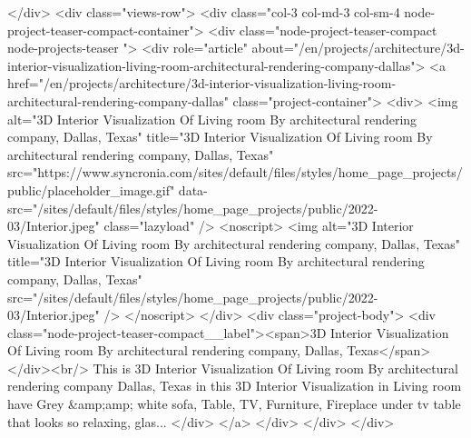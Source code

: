   </div>
    <div class="views-row">
    <div class="col-3 col-md-3 col-sm-4 node-project-teaser-compact-container">
	<div class="node-project-teaser-compact node-projects-teaser ">
		<div  role="article" about="/en/projects/architecture/3d-interior-visualization-living-room-architectural-rendering-company-dallas">
			<a href="/en/projects/architecture/3d-interior-visualization-living-room-architectural-rendering-company-dallas" class="project-container">
				<div>
					<img alt="3D Interior Visualization Of Living room By architectural rendering company, Dallas, Texas" title="3D Interior Visualization Of Living room By architectural rendering company, Dallas, Texas" src="https://www.syncronia.com/sites/default/files/styles/home_page_projects/public/placeholder_image.gif" data-src="/sites/default/files/styles/home_page_projects/public/2022-03/Interior.jpeg" class="lazyload" />
					<noscript>
						<img alt="3D Interior Visualization Of Living room By architectural rendering company, Dallas, Texas" title="3D Interior Visualization Of Living room By architectural rendering company, Dallas, Texas" src="/sites/default/files/styles/home_page_projects/public/2022-03/Interior.jpeg" />
					</noscript>
				</div>
				<div class="project-body">
				<div class="node-project-teaser-compact__label"><span>3D Interior Visualization Of Living room By architectural rendering company, Dallas, Texas</span>
</div><br/>
				This is 3D Interior Visualization Of Living room By architectural rendering company Dallas, Texas in this 3D Interior Visualization in Living room have Grey &amp;amp; white sofa, Table, TV, Furniture, Fireplace under tv table that looks so relaxing, glas...
				</div>
			</a>
		</div>
	</div>
</div>


